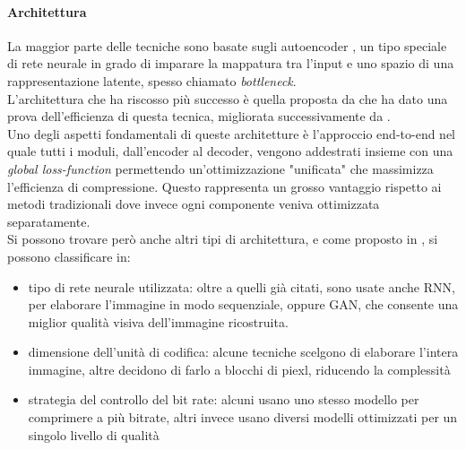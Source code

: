 \paragraph{Architettura}La maggior parte delle tecniche sono basate sugli autoencoder \cite{theis2017lossy}, un tipo speciale di rete neurale in grado di imparare la mappatura tra l'input e uno spazio di una rappresentazione latente, spesso chiamato \textit{bottleneck}.\\
L'architettura che ha riscosso più successo è quella proposta da \cite{balle2018variational} che ha dato una prova dell'efficienza di questa tecnica, migliorata successivamente da \cite{minnen2018joint}.\\
Uno degli aspetti fondamentali di queste architetture è l'approccio end-to-end nel quale tutti i moduli, dall'encoder al decoder, vengono addestrati insieme con una \textit{global loss-function} permettendo un'ottimizzazione "unificata" che massimizza l'efficienza di compressione. Questo rappresenta un grosso vantaggio rispetto ai metodi tradizionali dove invece ogni componente veniva ottimizzata separatamente.\\
Si possono trovare però anche altri tipi di architettura, e come proposto in \cite{ascenso2019report}, si possono classificare in:
\begin{itemize}
    \item tipo di rete neurale utilizzata: oltre a quelli già citati, sono usate anche RNN, per elaborare l'immagine in modo sequenziale, oppure GAN, che consente una miglior qualità visiva dell'immagine ricostruita.
    \item dimensione dell'unità di codifica: alcune tecniche scelgono di elaborare l'intera immagine, altre decidono di farlo a blocchi di piexl, riducendo la complessità
    \item strategia del controllo del bit rate: alcuni usano uno stesso modello per comprimere a più bitrate, altri invece usano diversi modelli ottimizzati per un singolo livello di qualità
\end{itemize}

